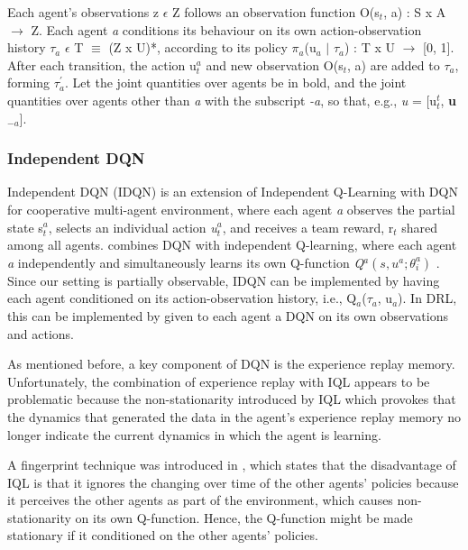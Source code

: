 \documentclass{llncs}
\begin{document}
Each agent's observations z $\epsilon$ Z follows an observation function O(s$_{t}$, a) : S x A $\rightarrow$ Z. Each agent \textit{a} conditions its behaviour on its own action-observation history $\tau_{a}$ $\epsilon$ T $\equiv$ (Z x U)*, according to its policy $\pi_{a}$(u$_{a}$ $|$ $\tau_{a}$) : T x U $\rightarrow$ [0, 1]. After each transition, the action u$_{t}^{a}$ and new observation O(s$_{t}$, a) are added to $\tau_{a}$, forming $\tau_{a}^{'}$. Let the joint quantities over agents be in bold, and the joint quantities over agents other than \textit{a} with the subscript \textit{-a}, so that, e.g., \emph{u} = [u$_{t}^{t}$, \textbf{u}$_{-a}$].

\subsubsection{Independent DQN}

Independent DQN (IDQN) is an extension of Independent Q-Learning\cite{Tan1993} with DQN for cooperative multi-agent environment, where each agent \textit{a} observes the partial state s$_{t}^{a}$, selects an individual action \textit{u$_{t}^{a}$}, and receives a team reward, r$_{t}$ shared among all agents. \cite{Tampuu2015} combines DQN with independent Q-learning, where each agent \textit{a} independently and simultaneously learns its own Q-function \textit{Q$^{a}(s, u^{a};\theta^{a}_{i})$} \cite{DBLP:journals/corr/FoersterAFW16a}. Since our setting is partially observable, IDQN can be implemented by having each agent conditioned on its action-observation history, i.e., Q$_{a}$($\tau_{a}$, u$_{a}$). In DRL, this can be implemented by given to each agent a DQN on its own observations and actions.

As mentioned before, a key component of DQN is the experience replay memory.  Unfortunately, the combination of experience replay with IQL appears to be problematic because the non-stationarity introduced by IQL which provokes that the dynamics that generated the data in the agent's experience replay memory no longer indicate the current dynamics in which the agent is learning.

A fingerprint technique was introduced in \cite{Foerster2017}, which states that the disadvantage of IQL is that it ignores the changing over time of the other agents' policies because it perceives the other agents as part of the environment, which causes non-stationarity on its own Q-function. Hence, the Q-function might be made stationary if it conditioned on the other agents' policies.
\end{document}
